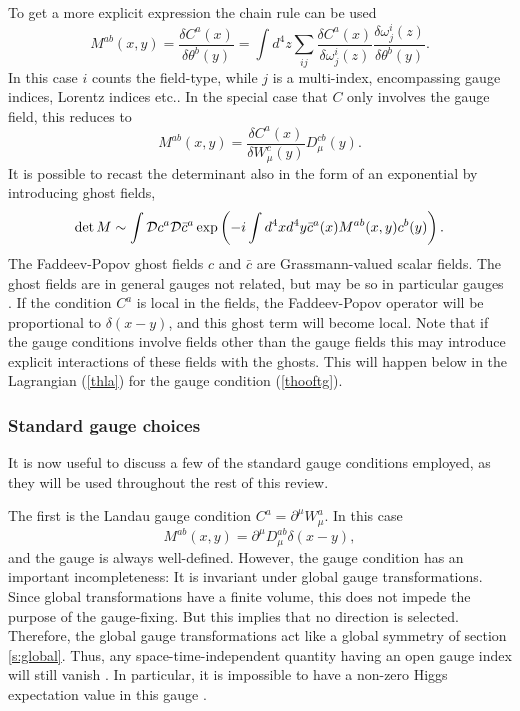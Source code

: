 \documentclass[final,12pt]{article}
\newcommand*{\no}{\noindent}
\newcommand*{\be}{\begin{equation}}
\newcommand*{\ee}{\end{equation}}
\newcommand*{\pd}{\partial}
\newcommand*{\pref}[1]{(\ref{#1})}
\newcommand*{\nn}{\nonumber}
\newcommand*{\1}{1\!\!\!\bot}
\begin{document}
To get a more explicit expression the chain rule can be used
\be
M^{ab}(x,y)=\frac{\delta C^a(x)}{\delta\theta^b(y)}=\int d^4z\sum_{ij}\frac{\delta C^a(x)}{\delta \omega^i_j(z)}\frac{\delta \omega^i_j(z)}{\delta\theta^b(y)}\label{fpsumfield}.
\ee
In this case $i$ counts the field-type, while $j$ is a multi-index, encompassing gauge indices, Lorentz indices etc.. In the special case that $C$ only involves the gauge field, this reduces to
\be
M^{ab}(x,y)=\frac{\delta C^a(x)}{\delta W_\mu^c(y)}D_\mu^{cb}(y).
\ee
\no It is possible to recast the determinant also in the form of an exponential by introducing ghost fields,
\be
\det M\sim\int{\cal D}c^a{\cal D}{\bar c}^a\exp\left(-i\int d^4x d^4y \bar{c}^a(x) M^{ab}(x,y)c^b(y)\right)\nn.
\ee
\no The Faddeev-Popov ghost fields $c$ and $\bar c$ are Grassmann-valued scalar fields. The ghost fields are in general gauges not related, but may be so in particular gauges \cite{Alkofer:2000wg}. If the condition $C^a$ is local in the fields, the Faddeev-Popov operator will be proportional to $\delta(x-y)$, and this ghost term will become local. Note that if the gauge conditions involve fields other than the gauge fields this may introduce explicit interactions of these fields with the ghosts. This will happen below in the Lagrangian \pref{thla} for the gauge condition \pref{thooftg}.

\subsubsection{Standard gauge choices}\label{sss:stdgauge}

It is now useful to discuss a few of the standard gauge conditions employed, as they will be used throughout the rest of this review.

The first is the Landau gauge condition $C^a=\pd^\mu W^a_\mu$. In this case
\be
M^{ab}(x,y)=\pd^\mu D_\mu^{ab}\delta(x-y)\nn,
\ee
\no and the gauge is always well-defined. However, the gauge condition has an important incompleteness: It is invariant under global gauge transformations. Since global transformations have a finite volume, this does not impede the purpose of the gauge-fixing. But this implies that no direction is selected. Therefore, the global gauge transformations act like a global symmetry of section \ref{s:global}. Thus, any space-time-independent quantity having an open gauge index will still vanish \cite{Maas:2012ct}. In particular, it is impossible to have a non-zero Higgs expectation value in this gauge \cite{Maas:2012ct,Frohlich:1980gj,Lee:1974zg}.
\end{document}
